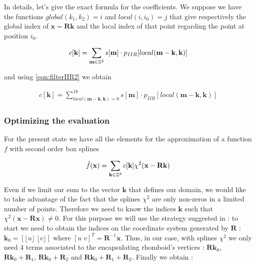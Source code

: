 \documentclass[proc]{edpsmath}
\begin{document}
In details, let's give the exact formula for the coefficients. We suppose we have the functions $global(k_1, k_2) = i$ and $local(i,i_0) = j$ that give respectively the global index of $\mathbf{x} = \mathbf{R} \mathbf{k}$ and the local index of that point regarding the point at position $i_0$.

\begin{equation}
c[\mathbf{k}] = \sum_{\mathbf{m} \in \mathbb{Z}^2} s[\mathbf{m}] \cdot p_{IIR}[local(\mathbf{m} - \mathbf{k}, \mathbf{k})]
\end{equation}

and using \eqref{eqn:filterIIR2} we obtain

\begin{align}
\label{eqn:coef_algo}
c[\mathbf{k}] = \sum_{local(\mathbf{m} - \mathbf{k}, \mathbf{k}) = 0}^{18} s[\mathbf{m}] \cdot p_{IIR}[local(\mathbf{m} - \mathbf{k}, \mathbf{k})]
\end{align}


\subsubsection{Optimizing the evaluation}

For the present state we have all the elements for the approximation of a function $f$ with second order box splines

\begin{equation}
\tilde{f}(\mathbf{x}) = \sum_{\mathbf{k} \in \mathbb{Z}^2} c[\mathbf{k}] \chi^2(\mathbf{x} - \mathbf{R}\mathbf{k})
\end{equation}

Even if we limit our sum to the vector $\mathbf{k}$ that defines our domain, we would like to take advantage of the fact that the splines $\chi^2$ are only non-zeros in a limited number of points. Therefore we need to know the indices $\mathbf{k}$ such that $\chi^2(\mathbf{x} - \mathbf{R} \mathbf{x}) \neq 0$. For this purpose we will use the strategy suggested in \cite{Condat2007} : to start we need to obtain the indices on the coordinate system generated by $\mathbf{R}$ : $\mathbf{k}_0 = \left[ \lfloor u \rfloor \; \lfloor v \rfloor \right]$ where $\left[ u \; v \right]^T = \mathbf{R}^ {-1} \mathbf{x} $. Thus, in our case, with splines $\chi^2$ we only need 4 terms associated to the encapsulating rhomboid's vertices : $\mathbf{R}\mathbf{k}_0$, $\mathbf{R}\mathbf{k}_0 + \mathbf{R}_1$, $\mathbf{R}\mathbf{k}_0 + \mathbf{R}_2$ and $\mathbf{R}\mathbf{k}_0 + \mathbf{R}_1 + \mathbf{R}_2$. Finally we obtain :
\end{document}

